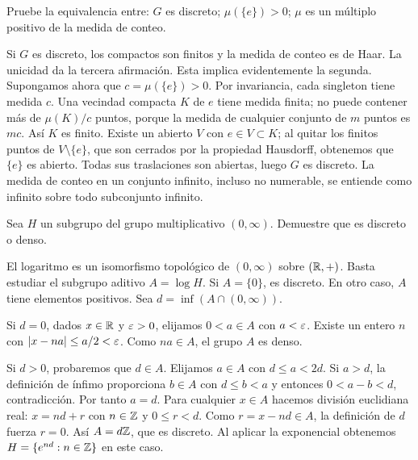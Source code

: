 \begin{ejercicio}\label{ej:v4-l20-2}
Pruebe la equivalencia entre: $G$ es discreto; $\mu(\{e\})>0$; $\mu$ es un múltiplo positivo de la medida de conteo.
\end{ejercicio}
\begin{solucion}
Si $G$ es discreto, los compactos son finitos y la medida de conteo es de Haar. La unicidad da la tercera afirmación. Esta implica evidentemente la segunda. Supongamos ahora que $c=\mu(\{e\})>0$. Por invariancia, cada singleton tiene medida $c$. Una vecindad compacta $K$ de $e$ tiene medida finita; no puede contener más de $\mu(K)/c$ puntos, porque la medida de cualquier conjunto de $m$ puntos es $mc$. Así $K$ es finito. Existe un abierto $V$ con $e\in V\subset K$; al quitar los finitos puntos de $V\setminus\{e\}$, que son cerrados por la propiedad Hausdorff, obtenemos que $\{e\}$ es abierto. Todas sus traslaciones son abiertas, luego $G$ es discreto. La medida de conteo en un conjunto infinito, incluso no numerable, se entiende como infinito sobre todo subconjunto infinito.
\end{solucion}

\begin{ejercicio}\label{ej:v4-l20-3}
Sea $H$ un subgrupo del grupo multiplicativo $(0,\infty)$. Demuestre que es discreto o denso.
\end{ejercicio}
\begin{solucion}
El logaritmo es un isomorfismo topológico de $(0,\infty)$ sobre $(\mathbb R,+)$. Basta estudiar el subgrupo aditivo $A=\log H$. Si $A=\{0\}$, es discreto. En otro caso, $A$ tiene elementos positivos. Sea $d=\inf(A\cap(0,\infty))$.

Si $d=0$, dados $x\in\mathbb R$ y $\varepsilon>0$, elijamos $0<a\in A$ con $a<\varepsilon$. Existe un entero $n$ con $|x-na|\leq a/2<\varepsilon$. Como $na\in A$, el grupo $A$ es denso.

Si $d>0$, probaremos que $d\in A$. Elijamos $a\in A$ con $d\leq a<2d$. Si $a>d$, la definición de ínfimo proporciona $b\in A$ con $d\leq b<a$ y entonces $0<a-b<d$, contradicción. Por tanto $a=d$. Para cualquier $x\in A$ hacemos división euclidiana real: $x=nd+r$ con $n\in\mathbb Z$ y $0\leq r<d$. Como $r=x-nd\in A$, la definición de $d$ fuerza $r=0$. Así $A=d\mathbb Z$, que es discreto. Al aplicar la exponencial obtenemos $H=\{e^{nd}:n\in\mathbb Z\}$ en este caso.
\end{solucion}


